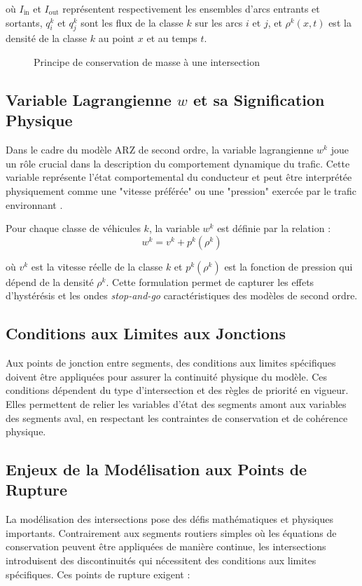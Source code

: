 où $ I_{\text{in}} $ et $ I_{\text{out}} $ représentent respectivement les ensembles d'arcs entrants et sortants, $ q_i^k $ et $ q_j^k $ sont les flux de la classe $ k $ sur les arcs $ i $ et $ j $, et $ \rho^k(x,t) $ est la densité de la classe $ k $ au point $ x $ et au temps $ t $.

\begin{figure}[htbp]
\centering
\caption{Principe de conservation de masse à une intersection}
\label{fig:conservation_masse}
\end{figure}

\subsection{Variable Lagrangienne $w$ et sa Signification Physique}
Dans le cadre du modèle ARZ de second ordre, la variable lagrangienne $ w^k $ joue un rôle crucial dans la description du comportement dynamique du trafic. Cette variable représente l'état comportemental du conducteur et peut être interprétée physiquement comme une "vitesse préférée" ou une "pression" exercée par le trafic environnant \cite{GaravelloPiccoli2006}.

Pour chaque classe de véhicules $ k $, la variable $ w^k $ est définie par la relation :
\[
w^k = v^k + p^k(\rho^k)
\]

où $ v^k $ est la vitesse réelle de la classe $ k $ et $ p^k(\rho^k) $ est la fonction de pression qui dépend de la densité $ \rho^k $. Cette formulation permet de capturer les effets d'hystérésis et les ondes \textit{stop-and-go} caractéristiques des modèles de second ordre.

\subsection{Conditions aux Limites aux Jonctions}
Aux points de jonction entre segments, des conditions aux limites spécifiques doivent être appliquées pour assurer la continuité physique du modèle. Ces conditions dépendent du type d'intersection et des règles de priorité en vigueur. Elles permettent de relier les variables d'état des segments amont aux variables des segments aval, en respectant les contraintes de conservation et de cohérence physique.

\subsection{Enjeux de la Modélisation aux Points de Rupture}
La modélisation des intersections pose des défis mathématiques et physiques importants. Contrairement aux segments routiers simples où les équations de conservation peuvent être appliquées de manière continue, les intersections introduisent des discontinuités qui nécessitent des conditions aux limites spécifiques. Ces points de rupture exigent :

